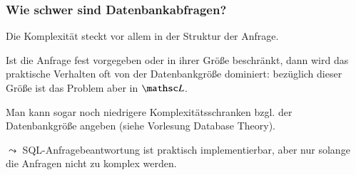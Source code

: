 \documentclass[aspectratio=1610,onlymath]{beamer}
\begin{document}
\begin{frame}\frametitle{Wie schwer sind Datenbankabfragen?}

\bigskip

Die Komplexität steckt vor allem in der Struktur der Anfrage.\bigskip

Ist die Anfrage fest vorgegeben oder in ihrer Größe beschränkt, dann wird das praktische Verhalten oft von der Datenbankgröße dominiert: bezüglich dieser Größe ist das Problem aber in $\LogSpace$.\bigskip

Man kann sogar noch niedrigere Komplexitätsschranken bzgl. der Datenbankgröße angeben (siehe Vorlesung Database Theory).
\bigskip

\alert{$\leadsto$ SQL-Anfragebeantwortung ist praktisch implementierbar, aber nur solange die Anfragen nicht zu komplex werden.}

\end{frame}

\end{document}
